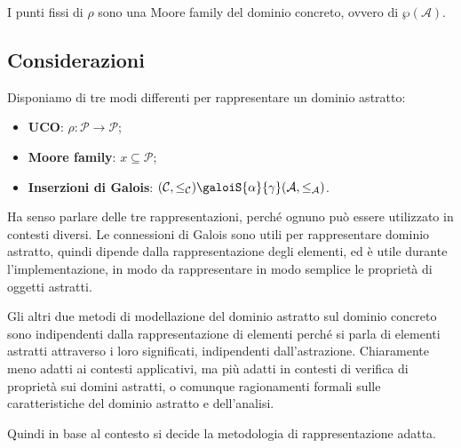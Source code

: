 \begin{tcolorbox}
    I punti fissi di $\rho$ sono una Moore family del dominio concreto, ovvero di $\wp(\mathcal{A})$.
\end{tcolorbox}
\subsection{Considerazioni}
Disponiamo di tre modi differenti per rappresentare un dominio astratto:
\begin{itemize}
    \item \textbf{UCO}: $\rho: \mathcal{P} \to \mathcal{P}$;
    \item \textbf{Moore family}: $x \subseteq \mathcal{P}$;
    \item \textbf{Inserzioni di Galois}: $(\mathcal{C}, \leq_\mathcal{C}) \galoiS{\alpha}{\gamma}
    (\mathcal{A}, \leq_\mathcal{A})$.
\end{itemize}
Ha senso parlare delle tre rappresentazioni, perché ognuno può essere utilizzato in contesti diversi.
Le connessioni di Galois sono utili per rappresentare dominio astratto, quindi dipende dalla rappresentazione degli elementi, 
ed è utile durante l'implementazione, in modo da rappresentare in modo semplice le proprietà 
di oggetti astratti.

Gli altri due metodi di modellazione del dominio astratto sul dominio concreto sono indipendenti 
dalla rappresentazione di elementi perché si parla di elementi astratti attraverso i loro significati, 
indipendenti dall'astrazione. Chiaramente meno adatti ai contesti applicativi, ma più adatti 
in contesti di verifica di proprietà sui domini astratti, o comunque ragionamenti formali sulle 
caratteristiche del dominio astratto e dell'analisi.

Quindi in base al contesto si decide la metodologia di rappresentazione adatta.

